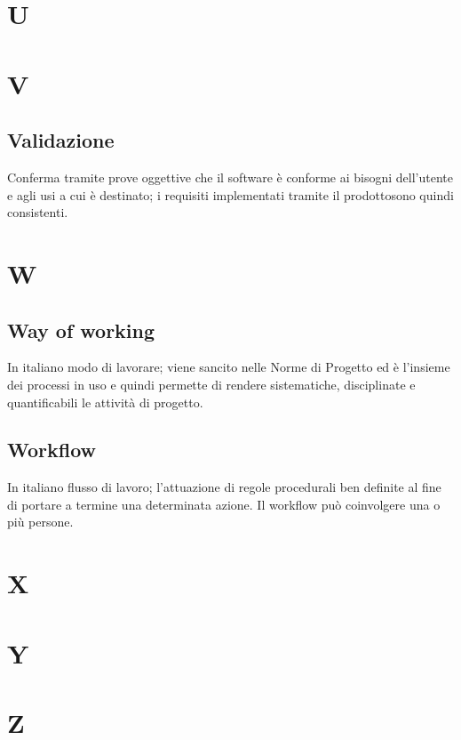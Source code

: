 \clearpage
\section*{U}

\clearpage
\section*{V}

\subsection*{Validazione}
Conferma tramite prove oggettive che il software è conforme ai bisogni dell'utente e agli usi a cui è destinato; i requisiti implementati tramite il prodotto\glosp sono quindi consistenti.

\clearpage
\section*{W}

\subsection*{Way of working}
In italiano modo di lavorare; viene sancito nelle Norme di Progetto ed è l'insieme dei processi in uso e quindi permette di rendere sistematiche, disciplinate e quantificabili le attività di progetto.

\subsection*{Workflow}
In italiano flusso di lavoro; l'attuazione di regole procedurali ben definite al fine di portare a termine una determinata azione. Il workflow può coinvolgere una o più persone.


\clearpage
\section*{X}

\clearpage
\section*{Y}

\clearpage
\section*{Z}

